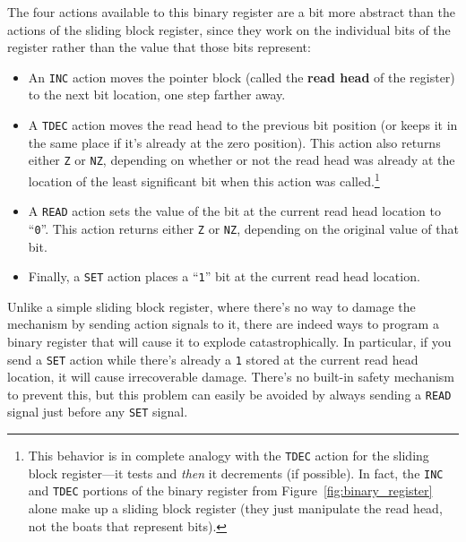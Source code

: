 The four actions available to this binary register are a bit more abstract than the actions of the sliding block register, since they work on the individual bits of the register rather than the value that those bits represent:\smallskip

\begin{itemize}
	\item An \texttt{INC} action moves the pointer block (called the \textbf{read head} of the register) to the next bit location, one step farther away.\smallskip
	
	\item A \texttt{TDEC} action moves the read head to the previous bit position (or keeps it in the same place if it's already at the zero position). This action also returns either \texttt{Z} or \texttt{NZ}, depending on whether or not the read head was already at the location of the least significant bit when this action was called.\footnote{This behavior is in complete analogy with the \texttt{TDEC} action for the sliding block register---it tests and \emph{then} it decrements (if possible). In fact, the \texttt{INC} and \texttt{TDEC} portions of the binary register from Figure~\ref{fig:binary_register} alone make up a sliding block register (they just manipulate the read head, not the boats that represent bits).}\smallskip
	
	\item A \texttt{READ} action sets the value of the bit at the current read head location to ``\texttt{0}''. This action returns either \texttt{Z} or \texttt{NZ}, depending on the original value of that bit.\smallskip
	
	\item Finally, a \texttt{SET} action places a ``\texttt{1}'' bit at the current read head location.\smallskip
\end{itemize}

Unlike a simple sliding block register, where there's no way to damage the mechanism by sending action signals to it, there are indeed ways to program a binary register that will cause it to explode catastrophically. In particular, if you send a \texttt{SET} action while there's already a \texttt{1} stored at the current read head location, it will cause irrecoverable damage. There's no built-in safety mechanism to prevent this, but this problem can easily be avoided by always sending a \texttt{READ} signal just before any \texttt{SET} signal.

